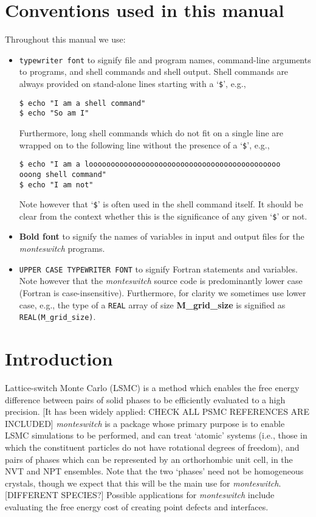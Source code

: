 \documentclass{report}
\begin{document}
\chapter*{Conventions used in this manual}
Throughout this manual we use:
\begin{itemize}
\item \texttt{typewriter font} to signify file and program names, command-line arguments to programs, and shell
commands and shell output. Shell commands are always provided on stand-alone lines starting with a `\verb|$|', e.g.,
\begin{verbatim}
$ echo "I am a shell command"
$ echo "So am I"
\end{verbatim}
Furthermore, long shell commands which do not fit on a single line are wrapped on to the following line without the presence of
a `\verb|$|', e.g.,
\begin{verbatim}
$ echo "I am a loooooooooooooooooooooooooooooooooooooooooooo
ooong shell command"
$ echo "I am not"
\end{verbatim}
Note however that `\verb|$|' is often used in the shell command itself. It should be clear from the context whether this is the
significance of any given `\verb|$|' or not.
\item \textbf{Bold font} to signify the names of variables in input and output files for the \emph{monteswitch} programs.
\item \texttt{UPPER CASE TYPEWRITER FONT} to signify Fortran statements and variables. Note however that the \emph{monteswitch} 
source code is predominantly lower case (Fortran is case-insensitive). Furthermore, for clarity we sometimes use lower case, e.g.,
the type of a \texttt{REAL} array of size \textbf{M\_grid\_size} is signified as \texttt{REAL(M\_grid\_size)}.
\end{itemize}


\chapter{Introduction}
Lattice-switch Monte Carlo (LSMC) \cite{Bruce_1997,Bruce_2000} is a method which enables the free energy difference between pairs of solid
phases to be efficiently evaluated to a high precision. [It has been widely applied: CHECK ALL PSMC REFERENCES ARE INCLUDED]
\cite{Bruce_1997,Pronk_1999,Bruce_2000,Wilding_2000,Jackson_2002,Errington_2004,McNeil-Watson_2006,Jackson_2007,Marechal_2008,Yang_2008,
Raiteri_2010,Quigley_2014,Bridgwater_2014}
%
\emph{monteswitch} is a package whose primary purpose is to enable LSMC simulations to be performed, and can treat 
`atomic' systems (i.e., those in which the constituent particles do not have rotational degrees of 
freedom), and pairs of phases which can be represented by an orthorhombic unit cell, in the NVT and NPT ensembles.
Note that the two `phases' need not be homogeneous crystals, though we expect that this will be the main use for \emph{monteswitch}.
[DIFFERENT SPECIES?]
Possible applications for \emph{monteswitch} include evaluating the free energy cost of creating
point defects and interfaces.
\end{document}
